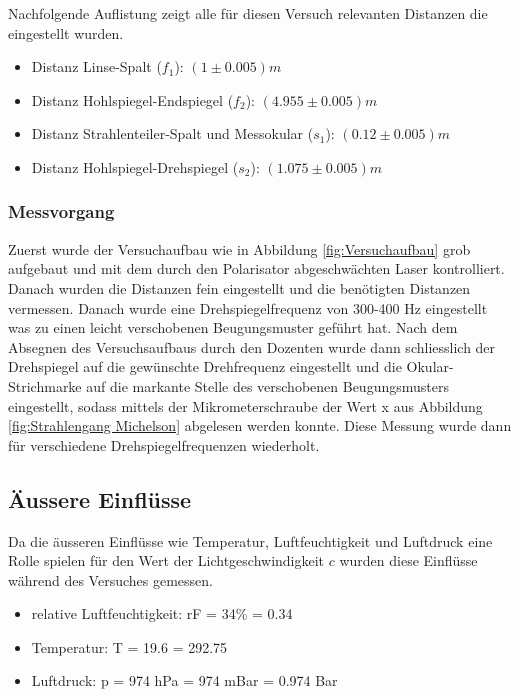 Nachfolgende Auflistung zeigt alle für diesen Versuch relevanten Distanzen die eingestellt wurden.

\begin{itemize}
\item Distanz Linse-Spalt ($f_{1}$): $(1\pm 0.005)m$
\item Distanz Hohlspiegel-Endspiegel ($f_{2}$): $(4.955\pm 0.005)m$
\item Distanz Strahlenteiler-Spalt und Messokular ($s_{1}$): $(0.12\pm 0.005)m$
\item Distanz Hohlspiegel-Drehspiegel ($s_{2}$): $(1.075\pm 0.005)m$
\end{itemize}

\subsubsection{Messvorgang}

Zuerst wurde der Versuchaufbau wie in Abbildung \ref{fig:Versuchaufbau} grob aufgebaut und mit dem durch den Polarisator abgeschwächten Laser kontrolliert. Danach wurden die Distanzen fein eingestellt und die benötigten Distanzen vermessen. Danach wurde eine Drehspiegelfrequenz von 300-400 Hz eingestellt was zu einen leicht verschobenen Beugungsmuster geführt hat. Nach dem Absegnen des Versuchsaufbaus durch den Dozenten wurde dann schliesslich der Drehspiegel auf die gewünschte Drehfrequenz eingestellt und die Okular-Strichmarke auf die markante Stelle des verschobenen Beugungsmusters eingestellt, sodass mittels der Mikrometerschraube der Wert x aus Abbildung \ref{fig:Strahlengang Michelson} abgelesen werden konnte. Diese Messung wurde dann für verschiedene Drehspiegelfrequenzen wiederholt.

\subsection{Äussere Einflüsse}
\label{sec:Äussere Einflüsse}

Da die äusseren Einflüsse wie Temperatur, Luftfeuchtigkeit und Luftdruck eine Rolle spielen für den Wert der Lichtgeschwindigkeit $c$ wurden diese Einflüsse während des Versuches gemessen.

\begin{itemize}
\item relative Luftfeuchtigkeit: rF = 34\% = 0.34
\item Temperatur: T = 19.6 = 292.75
\item Luftdruck: p = 974 hPa = 974 mBar = 0.974 Bar
\end{itemize}


